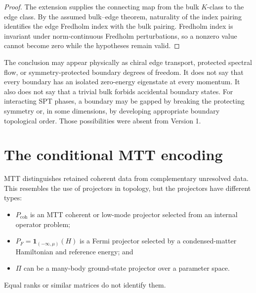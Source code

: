 \documentclass[11pt]{article}
\theoremstyle{definition}
\theoremstyle{remark}
\begin{document}
\begin{proof}
The extension supplies the connecting map from the bulk \(K\)-class to the
edge class.  By the assumed bulk--edge theorem, naturality of the index
pairing identifies the edge Fredholm index with the bulk pairing.  Fredholm
index is invariant under norm-continuous Fredholm perturbations, so a
nonzero value cannot become zero while the hypotheses remain valid.
\end{proof}

The conclusion may appear physically as chiral edge transport, protected
spectral flow, or symmetry-protected boundary degrees of freedom.  It does
not say that every boundary has an isolated zero-energy eigenstate at every
momentum.  It also does not say that a trivial bulk forbids accidental
boundary states.  For interacting SPT phases, a boundary may be gapped by
breaking the protecting symmetry or, in some dimensions, by developing
appropriate boundary topological order.  Those possibilities were absent
from Version 1.

\section{The conditional MTT encoding}
\label{sec:mtt}

MTT distinguishes retained coherent data from complementary unresolved
data.  This resembles the use of projectors in topology, but the projectors
have different types:
\begin{itemize}
\item \(P_{\mathrm{coh}}\) is an MTT coherent or low-mode projector selected
  from an internal operator problem;
\item \(P_F=\mathbf 1_{(-\infty,\mu)}(H)\) is a Fermi projector selected by a
  condensed-matter Hamiltonian and reference energy; and
\item \(\Pi\) can be a many-body ground-state projector over a parameter
  space.
\end{itemize}
Equal ranks or similar matrices do not identify them.
\end{document}
